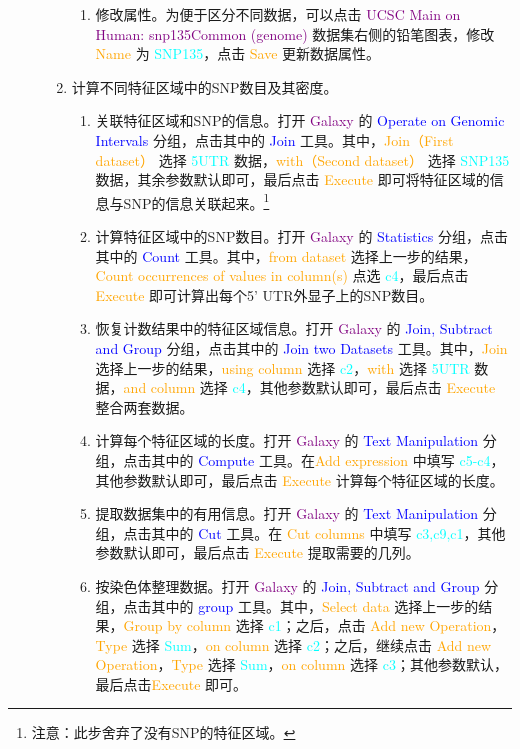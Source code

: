\begin{description}
\begin{enumerate}
\begin{enumerate}
					\item 修改属性。为便于区分不同数据，可以点击 \textcolor{purple}{UCSC Main on Human: snp135Common (genome)} 数据集右侧的铅笔图表，修改 \textcolor{orange}{Name} 为 \textcolor{cyan}{SNP135}，点击 \textcolor{orange}{Save} 更新数据属性。
				\end{enumerate}
			\item 计算不同特征区域中的SNP数目及其密度。 
				\begin{enumerate}
					\item 关联特征区域和SNP的信息。打开 \textcolor{purple}{Galaxy} 的 \textcolor{blue}{Operate on Genomic Intervals} 分组，点击其中的 \textcolor{blue}{Join} 工具。其中，\textcolor{orange}{Join（First dataset）} 选择 \textcolor{cyan}{5UTR} 数据，\textcolor{orange}{with（Second dataset）} 选择 \textcolor{cyan}{SNP135} 数据，其余参数默认即可，最后点击 \textcolor{orange}{Execute} 即可将特征区域的信息与SNP的信息关联起来。\footnote{注意：此步舍弃了没有SNP的特征区域。}
					\item 计算特征区域中的SNP数目。打开 \textcolor{purple}{Galaxy} 的 \textcolor{blue}{Statistics} 分组，点击其中的 \textcolor{blue}{Count} 工具。其中，\textcolor{orange}{from dataset} 选择上一步的结果，\textcolor{orange}{Count occurrences of values in column(s)} 点选 \textcolor{cyan}{c4}，最后点击 \textcolor{orange}{Execute} 即可计算出每个5' UTR外显子上的SNP数目。
					\item 恢复计数结果中的特征区域信息。打开 \textcolor{purple}{Galaxy} 的 \textcolor{blue}{Join, Subtract and Group} 分组，点击其中的 \textcolor{blue}{Join two Datasets} 工具。其中，\textcolor{orange}{Join} 选择上一步的结果，\textcolor{orange}{using column} 选择 \textcolor{cyan}{c2}，\textcolor{orange}{with} 选择 \textcolor{cyan}{5UTR} 数据，\textcolor{orange}{and column} 选择 \textcolor{cyan}{c4}，其他参数默认即可，最后点击 \textcolor{orange}{Execute} 整合两套数据。
					\item 计算每个特征区域的长度。打开 \textcolor{purple}{Galaxy} 的 \textcolor{blue}{Text Manipulation} 分组，点击其中的 \textcolor{blue}{Compute} 工具。在\textcolor{orange}{Add expression} 中填写 \textcolor{cyan}{c5-c4}，其他参数默认即可，最后点击 \textcolor{orange}{Execute} 计算每个特征区域的长度。
					\item 提取数据集中的有用信息。打开 \textcolor{purple}{Galaxy} 的 \textcolor{blue}{Text Manipulation} 分组，点击其中的 \textcolor{blue}{Cut} 工具。在 \textcolor{orange}{Cut columns} 中填写 \textcolor{cyan}{c3,c9,c1}，其他参数默认即可，最后点击 \textcolor{orange}{Execute} 提取需要的几列。
					\item 按染色体整理数据。打开 \textcolor{purple}{Galaxy} 的 \textcolor{blue}{Join, Subtract and Group} 分组，点击其中的 \textcolor{blue}{group} 工具。其中，\textcolor{orange}{Select data} 选择上一步的结果，\textcolor{orange}{Group by column} 选择 \textcolor{cyan}{c1}；之后，点击 \textcolor{orange}{Add new Operation}，\textcolor{orange}{Type} 选择 \textcolor{cyan}{Sum}，\textcolor{orange}{on column} 选择 \textcolor{cyan}{c2}；之后，继续点击 \textcolor{orange}{Add new Operation}，\textcolor{orange}{Type} 选择 \textcolor{cyan}{Sum}，\textcolor{orange}{on column} 选择 \textcolor{cyan}{c3}；其他参数默认，最后点击\textcolor{orange}{Execute} 即可。

\end{enumerate}
\end{enumerate}
\end{description}
